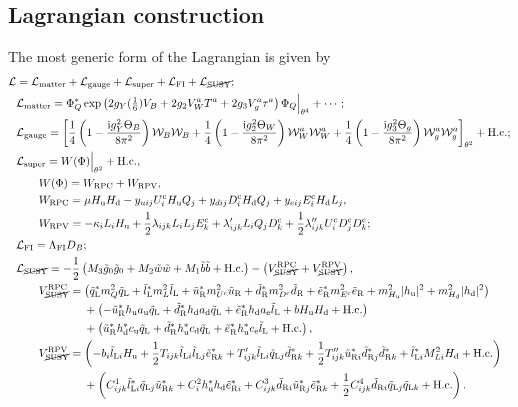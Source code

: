 \documentclass[CheatSheet]{subfiles}
\begin{document}
\subsection{Lagrangian construction}
The most generic form of the Lagrangian is given by
\begin{align}
\mathcal L &= \mathcal L\w{matter}+\mathcal L\w{gauge} + \mathcal L\w{super} + \mathcal L\w{FI} + \mathcal L_{\text{\cancel{SUSY}}};
\\%
&\mathcal L\w{matter}=
\Phi_Q^*
\exp\left(2g_Y(\tfrac16)V_B+2g_2V_W^aT^a+2g_3V_g^a\tau^a\right)\Phi_Q\Big|_{\theta^4} + \cdots;
\\&
\mathcal L\w{gauge}
=
\left[
 \frac14\left(1-\frac{\ii g_Y^2\Theta_B}{8\pi^2}\right)\mathcal W_B\mathcal W_B
+ \frac14\left(1-\frac{\ii g_2^2\Theta_W}{8\pi^2}\right)\mathcal W_W^a\mathcal W_W^a
+ \frac14\left(1-\frac{\ii g_3^2\Theta_g}{8\pi^2}\right)\mathcal W_g^a\mathcal W_g^a
\right]_{\theta^2} +\text{H.c.};
\\&
\mathcal L\w{super} = W(\Phi)\Big|_{\theta^2}+\text{H.c.},
\\&\qquad W(\Phi)=W\w{RPC}+W\w{RPV},
\\&\qquad
 W\w{RPC} = \mu\Hu\Hd
           - \yu[ij] U^\cc_i\Hu Q_j
           + \yd[ij] D^\cc_i\Hd Q_j
           + \ye[ij] E^\cc_i\Hd L_j,
\\&\qquad
 W\w{RPV} = -\kappa_i L_i\Hu
           + \frac12 \lambda  _{ijk} L_i L_j E^\cc_k
           +         \lambda' _{ijk} L_i Q_j D^\cc_k
           + \frac12 \lambda''_{ijk} U^\cc_i D^\cc_j D^\cc_k;
\\&
\mathcal L\w{FI}=\Lambda\w{FI} D_B;
\\&
\mathcal L_{\text{\cancel{SUSY}}}=
- \frac12\left(M_3\tig_0\tig_0+M_2\tiw\tiw+M_1\tib\tib+\text{H.c.}\right)
-
\left(
V^{\mathrm{RPC}}_{\text{\cancel{SUSY}}}
+V^{\mathrm{RPV}}_{\text{\cancel{SUSY}}}\right),
\\&\qquad
V^{\mathrm{RPC}}_{\text{\cancel{SUSY}}}=
\left(\tqL^*m_Q^2\tqL+\tlL^*m_L^2\tlL+\tuR^* m_{U^\cc}^2\tuR + \tdR^* m_{D^\cc}^2\tdR + \teR^* m_{E^\cc}^2\teR
       +m^2_{\Hu}|\hu|^2 + m^2_{\Hd}|\hd|^2\right)
\notag\\&\qquad\qquad\qquad
       +\left(-\tuR^*\hu {a\w u}\tqL + \tdR^* \hd {a\w d} \tqL+ \teR^* \hd {a\w e} \tlL + b\Hu\Hd+\text{H.c.}\right)
\notag\\&\qquad\qquad\qquad
       +\left(\tuR^*\hd^*{c\w u}\tqL+\tdR^* \hu^*{c\w d}\tqL+\teR^*\hu^*{c\w e}\tlL+\text{H.c.}\right),
\\&\qquad
V^{\mathrm{RPV}}_{\text{\cancel{SUSY}}}
=
    \left(-b_i\tlL[i]\Hu +\frac12T_{ijk}\tlL[i]\tlL[j]\teR[k]^*+T'_{ijk}\tlL[i]\tqL[j]\tdR[k]^*
             +\frac12T''_{ijk}\tuR[i]^*\tdR[j]^*\tdR[k]^*
    +\tlL[i]^*M^2_{Li}\Hd+\text{H.c.}\right)
\notag\\&\qquad\qquad\qquad
   + \left(C^1_{ijk}\tlL[i]^*\tqL[j]\tuR[k]^* + C^2_i\hu^*\hd\teR[i]^* + C^3_{ijk}\tdR[i]\tuR[j]^*\teR[k]^*+\frac12C^4_{ijk}\tdR[i]\tqL[j]\tqL[k]+\text{H.c.}\right).
\end{align}
\end{document}

